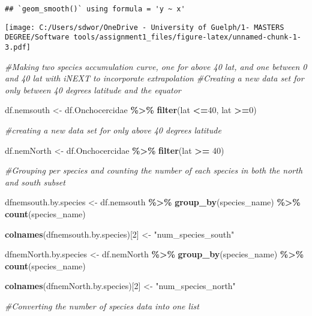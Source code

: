 \documentclass[
]{article}
\newenvironment{Shaded}{\begin{snugshade}}{\end{snugshade}}
\newcommand{\CommentTok}[1]{\textcolor[rgb]{0.56,0.35,0.01}{\textit{#1}}}
\newcommand{\DecValTok}[1]{\textcolor[rgb]{0.00,0.00,0.81}{#1}}
\newcommand{\FunctionTok}[1]{\textcolor[rgb]{0.13,0.29,0.53}{\textbf{#1}}}
\newcommand{\NormalTok}[1]{#1}
\newcommand{\OtherTok}[1]{\textcolor[rgb]{0.56,0.35,0.01}{#1}}
\newcommand{\SpecialCharTok}[1]{\textcolor[rgb]{0.81,0.36,0.00}{\textbf{#1}}}
\newcommand{\StringTok}[1]{\textcolor[rgb]{0.31,0.60,0.02}{#1}}
\begin{document}
\begin{verbatim}
## `geom_smooth()` using formula = 'y ~ x'
\end{verbatim}

\texttt{[image: C:/Users/sdwor/OneDrive - University of Guelph/1- MASTERS DEGREE/Software tools/assignment1\_files/figure-latex/unnamed-chunk-1-3.pdf]}

\begin{Shaded}
\begin{Highlighting}[]
\CommentTok{\#Making two species accumulation curve, one for above 40 lat, and one between 0 and 40 lat with iNEXT to incorporate extrapolation }
\CommentTok{\#Creating a new data set for only between 40 degrees latitude and the equator}

\NormalTok{df.nemsouth }\OtherTok{\textless{}{-}}\NormalTok{ df.Onchocercidae }\SpecialCharTok{\%\textgreater{}\%}
  \FunctionTok{filter}\NormalTok{(lat }\SpecialCharTok{\textless{}=}\DecValTok{40}\NormalTok{, lat }\SpecialCharTok{\textgreater{}=}\DecValTok{0}\NormalTok{)}

\CommentTok{\#creating a new data set for only above 40 degrees latitude}

\NormalTok{df.nemNorth }\OtherTok{\textless{}{-}}\NormalTok{ df.Onchocercidae }\SpecialCharTok{\%\textgreater{}\%}
  \FunctionTok{filter}\NormalTok{(lat }\SpecialCharTok{\textgreater{}=} \DecValTok{40}\NormalTok{)}

\CommentTok{\#Grouping per species and counting the number of each species in both the north and south subset }

\NormalTok{dfnemsouth.by.species }\OtherTok{\textless{}{-}}\NormalTok{ df.nemsouth }\SpecialCharTok{\%\textgreater{}\%}
  \FunctionTok{group\_by}\NormalTok{(species\_name) }\SpecialCharTok{\%\textgreater{}\%}
  \FunctionTok{count}\NormalTok{(species\_name)}

\FunctionTok{colnames}\NormalTok{(dfnemsouth.by.species)[}\DecValTok{2}\NormalTok{] }\OtherTok{\textless{}{-}} \StringTok{"num\_species\_south"}

\NormalTok{dfnemNorth.by.species }\OtherTok{\textless{}{-}}\NormalTok{ df.nemNorth }\SpecialCharTok{\%\textgreater{}\%}
  \FunctionTok{group\_by}\NormalTok{(species\_name) }\SpecialCharTok{\%\textgreater{}\%}
  \FunctionTok{count}\NormalTok{(species\_name)}

\FunctionTok{colnames}\NormalTok{(dfnemNorth.by.species)[}\DecValTok{2}\NormalTok{] }\OtherTok{\textless{}{-}} \StringTok{"num\_species\_north"}

\CommentTok{\#Converting the number of species data into one list}


\end{Highlighting}
\end{Shaded}
\end{document}
